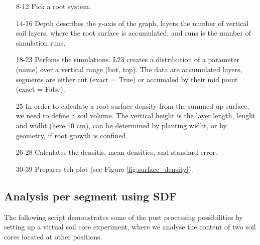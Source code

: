\begin{itemize}

\item[8-12] Pick a root system.
\item[14-16] Depth describes the y-axis of the graph, layers the number of vertical soil layers, where the root surface is accumulated, and runs is the number of simulation runs. 
\item[18-23] Perfoms the simulations. L23 creates a distribution of a parameter (name) over a vertical range (bot, top). The data are accumulated layers, segments are either cut (exact = True) or accumaled by their mid point (exact = False). 
\item[25] In order to calculate a root surface density from the summed up surface, we need to define a soil volume. The vertical height is the layer length, lenght and widht (here 10 cm), can be determined by planting widht, or by geometry, if root growth is confined. 
\item[26-28] Calculates the densitis, mean densities, and standard error. 
\item[30-39] Prepares teh plot (see Figure \ref{fig:surface_density}).

\end{itemize}



\subsection{Analysis per segment using SDF}

The following script demonstrates some of the post processing possibilities by setting up a virtual soil core experiment, where we analyse the content of two soil cores located at other positions.



